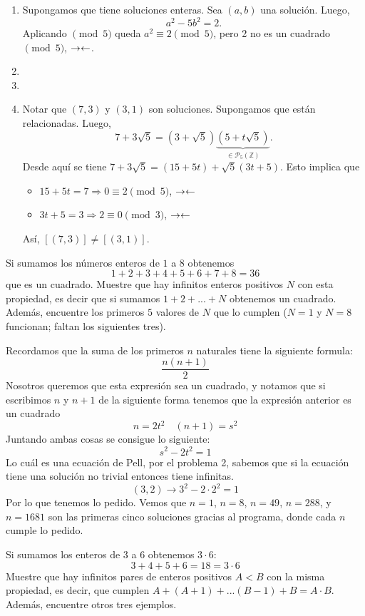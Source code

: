 \begin{sol}
\begin{enumerate}[label = (\roman*)]
		\item Supongamos que tiene soluciones enteras. Sea $(a, b)$ una solución. Luego,
		      $$a^2 - 5b^2 = 2.$$
			  Aplicando $\pmod{5}$ queda $a^2 \equiv 2 \pmod{5}$, pero 2 no es un cuadrado $\pmod{5}$, $\rightarrow\leftarrow$.
		\item
		\item
		\item Notar que $(7, 3)$ y $(3, 1)$ son soluciones. Supongamos que están relacionadas. Luego, 
		$$7 + 3\sqrt{5} = (3 + \sqrt{5})\underbrace{(5 + t\sqrt{5})}_{\in \mathcal{P}_5 (\mathbb{Z})}.$$
		Desde aquí se tiene $7 + 3\sqrt{5} = (15 + 5t) + \sqrt{5}(3t + 5)$.
		Esto implica que \begin{itemize}
		\item $15 + 5t = 7 \Rightarrow 0 \equiv 2 \pmod 5$, $\rightarrow\leftarrow$ \\
		\item $3t + 5 = 3 \Rightarrow 2 \equiv 0 \pmod 3$, $\rightarrow\leftarrow$
		\end{itemize}
		Así, $[(7, 3)] \not= [(3, 1)]$.	  
	\end{enumerate}
\end{sol}

\begin{prob}[3 pts.]
	Si sumamos los números enteros de $1$ a $8$ obtenemos
	\[1+2+3+4+5+6+7+8=36\]
	que es un cuadrado. Muestre que hay infinitos enteros positivos $N$ con esta propiedad, es decir que si sumamos $1+2+...+N$ obtenemos un cuadrado. Además, encuentre los primeros $5$ valores de $N$ que lo cumplen ($N=1$ y $N=8$ funcionan; faltan los siguientes tres).
\end{prob}

\begin{sol}
	Recordamos que la suma de los primeros $n$ naturales tiene la siguiente formula:
	\[
		\frac{n(n+1)}2
	\]
	Nosotros queremos que esta expresión sea un cuadrado, y notamos que si escribimos $n$ y $n+1$ de la siguiente forma tenemos que la expresión anterior es un cuadrado
	\[
		n=2t^2\quad(n+1)=s^2
	\]
	Juntando ambas cosas se consigue lo siguiente:
	\[
		s^2-2t^2=1
	\]
	Lo cuál es una ecuación de Pell, por el problema 2, sabemos que si la ecuación tiene una solución no trivial entonces tiene infinitas.
	\[
		(3,2)\rightarrow 3^2-2\cdot2^2=1
	\]
	Por lo que tenemos lo pedido. Vemos que $n=1$, $n=8$, $n=49$, $n=288$, y $n=1681$ son las primeras cinco soluciones gracias al programa\cite{prog}, donde cada $n$ cumple lo pedido.
\end{sol}

\begin{prob}[3 pts]
	Si sumamos los enteros de $3$ a $6$ obtenemos $3\cdot 6$:
	\[3+4+5+6=18=3\cdot 6\]
	Muestre que hay infinitos pares de enteros positivos $A<B$ con la misma propiedad, es decir, que cumplen $A+(A+1)+...(B-1)+B=A\cdot B$. Además, encuentre otros tres ejemplos.
\end{prob}

